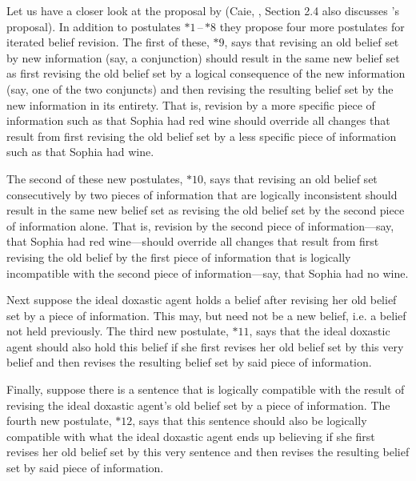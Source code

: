 Let us have a closer look at the proposal by \citet{dp97} (Caie, , Section 2.4 also discusses \citealt{b96}'s proposal). In addition to postulates $*1$\,--\,$*8$ they propose four more postulates for iterated belief revision. The first of these, $*9$, says that revising an old belief set by new information (say, a conjunction) should result in the same new belief set as first revising the old belief set by a logical consequence of the new information (say, one of the two conjuncts) and then revising the resulting belief set by the new information in its entirety. That is, revision by a more specific piece of information such as that Sophia had red wine should override all changes that result from first revising the old belief set by a less specific piece of information such as that Sophia had wine.

The second of these new postulates, $*10$, says that revising an old belief set consecutively by two pieces of information that are logically inconsistent should result in the same new belief set as revising the old belief set by the second piece of information alone. That is, revision by the second piece of information---say, that Sophia had red wine---should override all changes that result from first revising the old belief by the first piece of information that is logically incompatible with the second piece of information---say, that Sophia had no wine.

Next suppose the ideal doxastic agent holds a belief after revising her old belief set by a piece of information. This may, but need not be a new belief, i.e. a belief not held previously. The third new postulate, $*11$, says that the ideal doxastic agent should also hold this belief if she first revises her old belief set by this very belief and then revises the resulting belief set by said piece of information.

Finally, suppose there is a sentence that is logically compatible with the result of revising the ideal doxastic agent's old belief set by a piece of information. The fourth new postulate, $*12$, says that this sentence should also be logically compatible with what the ideal doxastic agent ends up believing if she first revises her old belief set by this very sentence and then revises the resulting belief set by said piece of information.


